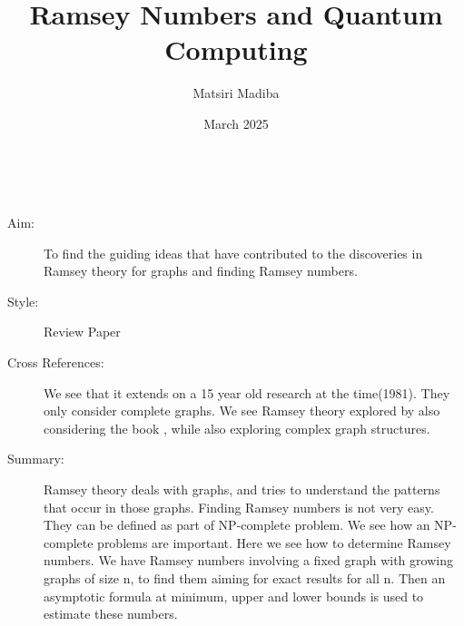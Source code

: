 \documentclass{Assignment}
\author{Matsiri Madiba}
\date{March 2025}
\title{Ramsey Numbers and Quantum Computing}
\begin{document}
\maketitle
\cite{burr1981generalized}~
\begin{description}
	\item[Aim:]
To find the guiding ideas that have contributed to the discoveries in Ramsey theory for graphs and finding Ramsey numbers.
\item[Style:]
Review Paper
\item[Cross References:]
We see that it extends on a 15 year old research at the time(1981). They only consider complete graphs. We see Ramsey theory explored by also considering the book \cite{graham1980ramsey}, while also exploring complex graph structures.
\item [Summary:]
Ramsey theory deals with graphs, and tries to understand the patterns that occur in those graphs.
Finding Ramsey numbers is not very easy.
They can be defined as part of NP-complete problem.
We see how an NP-complete problems are important.
Here we see how to determine Ramsey numbers.  
We have Ramsey numbers involving a fixed graph with growing graphs of size n, to find them aiming for exact results for all n. 
Then an asymptotic formula at minimum, upper and lower bounds is used to estimate these numbers.  

\end{description}

	 	\newpage
	 	
\end{document}
